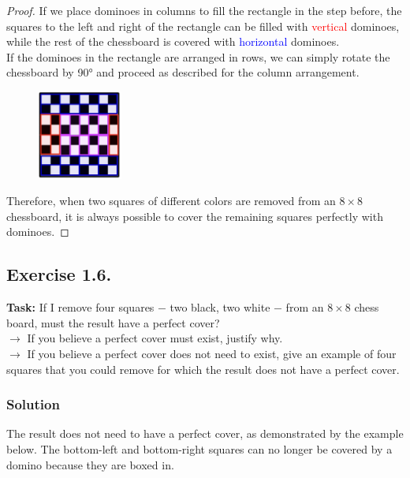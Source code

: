 \documentclass{article}
\begin{document}
\begin{proof}
If we place dominoes in columns to fill the rectangle in the step before, the squares to the left and right of the rectangle can be filled with \textcolor{red}{vertical} dominoes, while the rest of the chessboard is covered with \textcolor{blue}{horizontal} dominoes.\\
If the dominoes in the rectangle are arranged in rows, we can simply rotate the chessboard by 90° and proceed as described for the column arrangement.\\

\begin{figure}[htbp] \centering \includegraphics[width=0.25\textwidth]{images/1.5.4.jpg} %
\end{figure}

Therefore, when two squares of different colors are removed from an $8 \times 8$ chessboard, it is always possible to cover the remaining squares perfectly with dominoes. 
\end{proof}

\newpage

\subsection{Exercise 1.6.}
\textbf{Task:} If I remove four squares  $-$ two black, two white $-$ from an $8 \times 8$ chess board, must the result have a perfect cover?\\

\noindent $\longrightarrow$ If you believe a perfect cover must exist, justify why. \\

\noindent $\longrightarrow$ If you believe a perfect cover does not need to exist, give an example of four squares that you could remove for which the result does not have a perfect cover.

\subsubsection*{Solution}

The result does not need to have a perfect cover, as demonstrated by the example below. The bottom-left and bottom-right squares can no longer be covered by a domino because they are boxed in.
\end{document}
